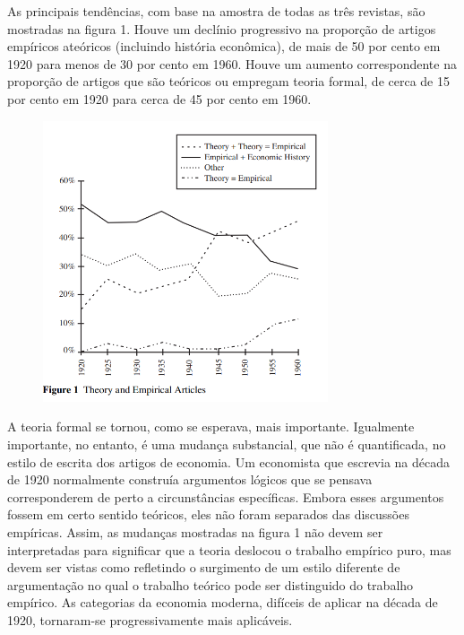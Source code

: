 \documentclass[12pt]{article}
\begin{document}
As principais tendências, com base na amostra de todas as três revistas, são mostradas na figura 1. Houve um declínio progressivo na proporção de artigos empíricos ateóricos (incluindo história econômica), de mais de 50 por cento em 1920 para menos de 30 por cento em 1960. Houve um aumento correspondente na proporção de artigos que são teóricos ou empregam teoria formal, de cerca de 15 por cento em 1920 para cerca de 45 por cento em 1960. 
 \begin{figure}[H]
    \centering
    \includegraphics[width=0.75\textwidth]{4º Período/História do Pensamento Econômico/Tradução HPE/Tradução Tópico 7.2/figure 1.png}
    \end{figure}


A teoria formal se tornou, como se esperava, mais importante. Igualmente importante, no entanto, é uma mudança substancial, que não é quantificada, no estilo de escrita dos artigos de economia. Um economista que escrevia na década de 1920 normalmente construía argumentos lógicos que se pensava corresponderem de perto a circunstâncias específicas. Embora esses argumentos fossem em certo sentido teóricos, eles não foram separados das discussões empíricas. Assim, as mudanças mostradas na figura 1 não devem ser interpretadas para significar que a teoria deslocou o trabalho empírico puro, mas devem ser vistas como refletindo o surgimento de um estilo diferente de argumentação no qual o trabalho teórico pode ser distinguido do trabalho empírico. As categorias da economia moderna, difíceis de aplicar na década de 1920, tornaram-se progressivamente mais aplicáveis.
\end{document}
